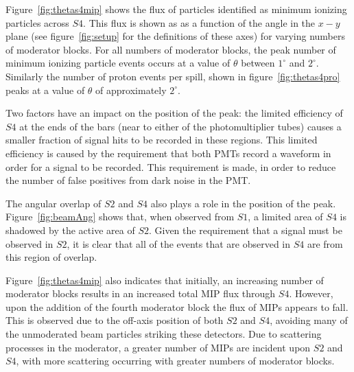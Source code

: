 Figure~\ref{fig:thetas4mip} shows the flux of particles identified as minimum ionizing particles across $\mathit{S4}$.
This flux is shown as as a function of the angle in the $x-y$ plane (see figure~\ref{fig:setup} for the definitions of these axes) for varying numbers of moderator blocks.
For all numbers of moderator blocks, the peak number of minimum ionizing particle events occurs at a value of $\theta$ between $1^{\circ}$ and $2^{\circ}$.
Similarly the number of proton events per spill, shown in figure~\ref{fig:thetas4pro} peaks at a value of $\theta$ of approximately $2^{\circ}$.

Two factors have an impact on the position of the peak:
the limited efficiency of $\mathit{S4}$ at the ends of the bars (near to either of the photomultiplier tubes) causes a smaller fraction of signal hits to be recorded in these regions. 
This limited efficiency is caused by the requirement that both PMTs record a waveform in order for a signal to be recorded.
This requirement is made, in order to reduce the number of false positives from dark noise in the PMT.

The angular overlap of $\mathit{S2}$ and $\mathit{S4}$ also plays a role in the position of the peak. 
Figure~\ref{fig:beamAng} shows that, when observed from $\mathit{S1}$, a limited area of $\mathit{S4}$ is shadowed by the active area of $\mathit{S2}$.
Given the requirement that a signal must be observed in $\mathit{S2}$, it is clear that all of the events that are observed in $\mathit{S4}$ are from this region of overlap.

Figure~\ref{fig:thetas4mip} also indicates that initially, an increasing number of moderator blocks results in an increased total MIP flux through $\mathit{S4}$. 
However, upon the addition of the fourth moderator block the flux of MIPs appears to fall.
This is observed due to the off-axis position of both $\mathit{S2}$ and $\mathit{S4}$, avoiding many of the unmoderated beam particles striking these detectors.
Due to scattering processes in the moderator, a greater number of MIPs are incident upon $\mathit{S2}$ and $\mathit{S4}$, with more scattering occurring with greater numbers of moderator blocks.


